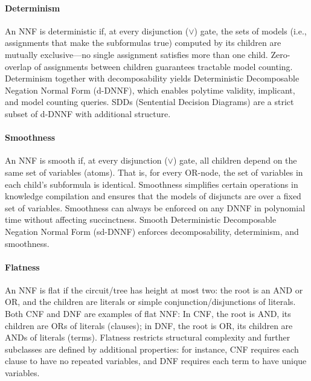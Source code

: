 \paragraph{Determinism}
An NNF is deterministic if, at every disjunction ($\lor$) gate, the sets of models (i.e., assignments that make the subformulas true) computed by its children are mutually exclusive—no single assignment satisfies more than one child. 
Zero-overlap of assignments between children guarantees tractable model counting. Determinism together with decomposability yields Deterministic Decomposable Negation Normal Form (d-DNNF), which enables polytime validity, implicant, and model counting queries. SDDs (Sentential Decision Diagrams) are a strict subset of d-DNNF with additional structure.

\paragraph{Smoothness}
An NNF is smooth if, at every disjunction ($\lor$) gate, all children depend on the same set of variables (atoms). That is, for every OR-node, the set of variables in each child’s subformula is identical. Smoothness simplifies certain operations in knowledge compilation and ensures that the models of disjuncts are over a fixed set of variables. Smoothness can always be enforced on any DNNF in polynomial time without affecting succinctness. Smooth Deterministic Decomposable Negation Normal Form (sd-DNNF) enforces decomposability, determinism, and smoothness.

\paragraph{Flatness}
An NNF is flat if the circuit/tree has height at most two: the root is an AND or OR, and the children are literals or simple conjunction/disjunctions of literals. Both CNF and DNF are examples of flat NNF: In CNF, the root is AND, its children are ORs of literals (clauses); in DNF, the root is OR, its children are ANDs of literals (terms). Flatness restricts structural complexity and further subclasses are defined by additional properties: for instance, CNF requires each clause to have no repeated variables, and DNF requires each term to have unique variables.

